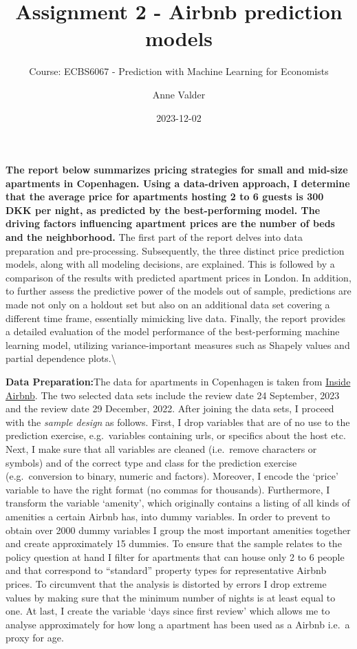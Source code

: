 \documentclass[
]{article}
\title{Assignment 2 - Airbnb prediction models}
\subtitle{Course: ECBS6067 - Prediction with Machine Learning for
Economists}
\author{Anne Valder}
\date{2023-12-02}
\begin{document}
\maketitle

\textbf{The report below summarizes pricing strategies for small and
mid-size apartments in Copenhagen. Using a data-driven approach, I
determine that the average price for apartments hosting 2 to 6 guests is
300 DKK per night, as predicted by the best-performing model. The
driving factors influencing apartment prices are the number of beds and
the neighborhood.} The first part of the report delves into data
preparation and pre-processing. Subsequently, the three distinct price
prediction models, along with all modeling decisions, are explained.
This is followed by a comparison of the results with predicted apartment
prices in London. In addition, to further assess the predictive power of
the models out of sample, predictions are made not only on a holdout set
but also on an additional data set covering a different time frame,
essentially mimicking live data. Finally, the report provides a detailed
evaluation of the model performance of the best-performing machine
learning model, utilizing variance-important measures such as Shapely
values and partial dependence plots.\textbackslash{}

\textbf{Data Preparation:}The data for apartments in Copenhagen is taken
from \href{http://insideairbnb.com/get-the-data/}{Inside Airbnb}. The
two selected data sets include the review date 24 September, 2023 and
the review date 29 December, 2022. After joining the data sets, I
proceed with the \emph{sample design} as follows. First, I drop
variables that are of no use to the prediction exercise, e.g.~variables
containing urls, or specifics about the host etc. Next, I make sure that
all variables are cleaned (i.e.~remove characters or symbols) and of the
correct type and class for the prediction exercise (e.g.~conversion to
binary, numeric and factors). Moreover, I encode the `price' variable to
have the right format (no commas for thousands). Furthermore, I
transform the variable `amenity', which originally contains a listing of
all kinds of amenities a certain Airbnb has, into dummy variables. In
order to prevent to obtain over 2000 dummy variables I group the most
important amenities together and create approximately 15 dummies. To
ensure that the sample relates to the policy question at hand I filter
for apartments that can house only 2 to 6 people and that correspond to
``standard'' property types for representative Airbnb prices. To
circumvent that the analysis is distorted by errors I drop extreme
values by making sure that the minimum number of nights is at least
equal to one. At last, I create the variable `days since first review'
which allows me to analyse approximately for how long a apartment has
been used as a Airbnb i.e.~a proxy for age.
\end{document}
